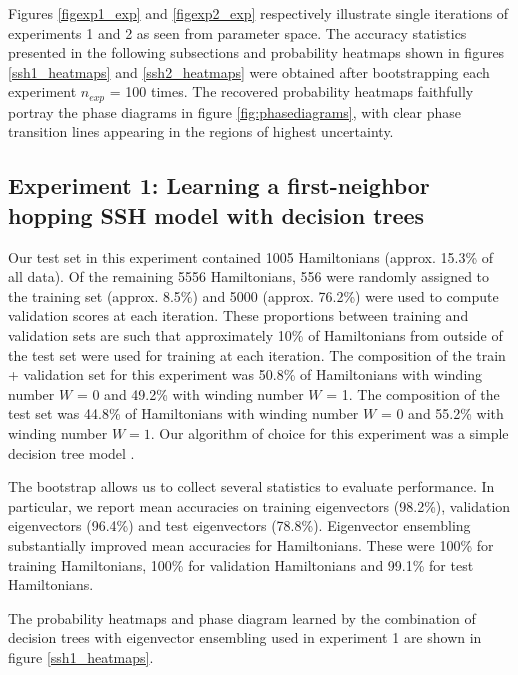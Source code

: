\documentclass[10pt]{revtex4-1}
\begin{document}
Figures \ref{figexp1_exp} and \ref{figexp2_exp} respectively illustrate single iterations of experiments 1 and 2 as seen from parameter space. The accuracy statistics presented in the following subsections and probability heatmaps shown in figures \ref{ssh1_heatmaps} and \ref{ssh2_heatmaps} were obtained after bootstrapping each experiment $n_{exp}$ = 100 times. The recovered probability heatmaps faithfully portray the phase diagrams in figure \ref{fig:phasediagrams}, with clear phase transition lines appearing in the regions of highest uncertainty.

\subsection*{Experiment 1: Learning a first-neighbor hopping SSH model with decision trees}

Our test set in this experiment contained 1005 Hamiltonians (approx. 15.3\% of all data). Of the remaining 5556 Hamiltonians, 556 were randomly assigned to the training set (approx. 8.5\%) and 5000 (approx. 76.2\%) were used to compute validation scores at each iteration. These proportions between training and validation sets are such that approximately 10\%  of Hamiltonians from outside of the test set were used for training at each iteration. The composition of the train + validation set for this experiment was 50.8\% of Hamiltonians with winding number $W$ = 0 and 49.2\% with winding number $W$ = 1. The composition of the test set was 44.8\% of Hamiltonians with winding number $W$ = 0 and 55.2\% with winding number $W=1$. Our algorithm of choice for this experiment was a simple decision tree model \cite{breiman2017classification}.

The bootstrap allows us to collect several statistics to evaluate performance. In particular, we report mean accuracies on training eigenvectors (98.2\%), validation eigenvectors (96.4\%) and test eigenvectors (78.8\%). Eigenvector ensembling substantially improved mean accuracies for Hamiltonians. These were 100\% for training Hamiltonians, 100\% for validation Hamiltonians and 99.1\% for test Hamiltonians.

The probability heatmaps and phase diagram learned by the combination of decision trees with eigenvector ensembling used in experiment 1 are shown in figure \ref{ssh1_heatmaps}.
\end{document}
